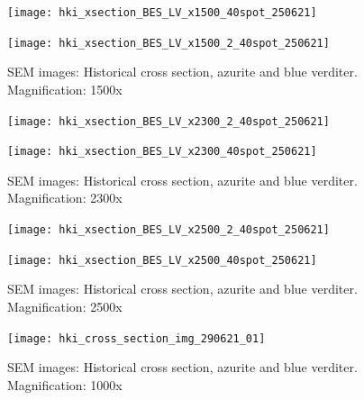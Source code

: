 \begin{figure}[H]
\centering
\begin{minipage}{.45\textwidth}
  \centering
  \texttt{[image: hki\_xsection\_BES\_LV\_x1500\_40spot\_250621]}
\end{minipage}
\begin{minipage}{.45\textwidth}
  \centering
  \texttt{[image: hki\_xsection\_BES\_LV\_x1500\_2\_40spot\_250621]}
\end{minipage}
\caption[SEM images: Historical cross section, azurite and blue verditer]{SEM images: Historical cross section, azurite and blue verditer. Magnification: 1500x}
\label{fig:xsection_jeol_5}
\end{figure}

\begin{figure}[H]
\centering
\begin{minipage}{.45\textwidth}
  \centering
  \texttt{[image: hki\_xsection\_BES\_LV\_x2300\_2\_40spot\_250621]}
\end{minipage}
\begin{minipage}{.45\textwidth}
  \centering
  \texttt{[image: hki\_xsection\_BES\_LV\_x2300\_40spot\_250621]}
\end{minipage}
\caption[SEM images: Historical cross section, azurite and blue verditer]{SEM images: Historical cross section, azurite and blue verditer. Magnification: 2300x}
\label{fig:xsection_jeol_6}
\end{figure}

\begin{figure}[H]
\centering
\begin{minipage}{.45\textwidth}
  \centering
  \texttt{[image: hki\_xsection\_BES\_LV\_x2500\_2\_40spot\_250621]}
\end{minipage}
\begin{minipage}{.45\textwidth}
  \centering
  \texttt{[image: hki\_xsection\_BES\_LV\_x2500\_40spot\_250621]}
\end{minipage}
\caption[SEM images: Historical cross section, azurite and blue verditer]{SEM images: Historical cross section, azurite and blue verditer. Magnification: 2500x}
\label{fig:xsection_jeol_7}
\end{figure}


\begin{figure}[H]
\centering
  \texttt{[image: hki\_cross\_section\_img\_290621\_01]}
\caption[SEM images: Historical cross section, azurite and blue verditer]{SEM images: Historical cross section, azurite and blue verditer. Magnification: 1000x}
\label{fig:xsection_dept_1}
\end{figure}

